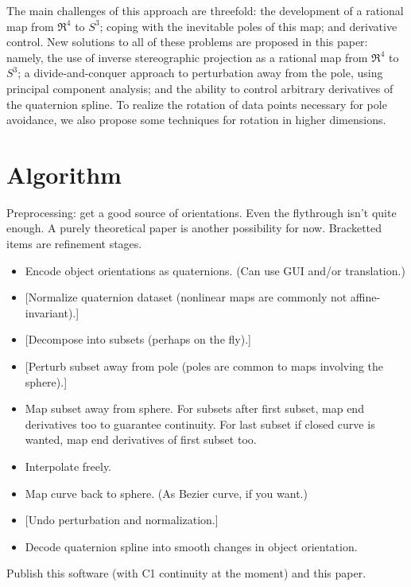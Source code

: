 \documentclass[12pt]{article}
\begin{document}
The main challenges of this approach are threefold: the development of a rational map from
$\Re^4$ to $S^3$; coping with the inevitable poles of this map;
and derivative control.
New solutions to all of these problems are proposed in this paper:
namely, the use of inverse stereographic projection as a rational map from 
$\Re^4$ to $S^3$; a divide-and-conquer approach to perturbation away from the pole,
using principal component analysis; 
and the ability to control arbitrary derivatives of the quaternion spline.
To realize the rotation of data points necessary for pole avoidance,
we also propose some techniques for rotation in higher dimensions.

\section{Algorithm}

Preprocessing: get a good source of orientations.
Even the flythrough isn't quite enough.
A purely theoretical paper is another possibility for now.
Bracketted items are refinement stages.

\begin{itemize}
\item Encode object orientations as quaternions. (Can use GUI and/or translation.)
\item {[Normalize quaternion dataset (nonlinear maps are commonly not affine-invariant).]}
\item {[Decompose into subsets (perhaps on the fly).]}
\item {[Perturb subset away from pole (poles are common to maps involving the sphere).]}
\item Map subset away from sphere.
      For subsets after first subset, map end derivatives too to guarantee continuity.
      For last subset if closed curve is wanted, map end derivatives of first subset too.
\item Interpolate freely.
\item Map curve back to sphere. (As Bezier curve, if you want.)
\item {[Undo perturbation and normalization.]}
\item Decode quaternion spline into smooth changes in object orientation.
\end{itemize}

Publish this software (with C1 continuity at the moment) and this paper.
\end{document}
